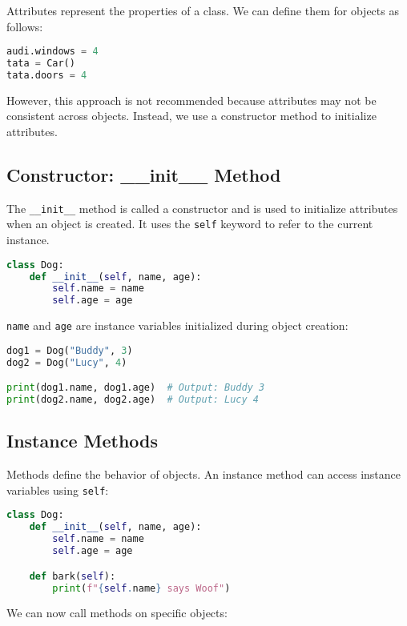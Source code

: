 Attributes represent the properties of a class. We can define them for objects as follows:

\begin{lstlisting}[language=Python]
audi.windows = 4
tata = Car()
tata.doors = 4
\end{lstlisting}

However, this approach is not recommended because attributes may not be consistent across objects. Instead, we use a constructor method to initialize attributes.

\subsection{Constructor: \_\_init\_\_ Method}

The \texttt{\_\_init\_\_} method is called a constructor and is used to initialize attributes when an object is created. It uses the \texttt{self} keyword to refer to the current instance.

\begin{lstlisting}[language=Python]
class Dog:
    def __init__(self, name, age):
        self.name = name
        self.age = age
\end{lstlisting}

\texttt{name} and \texttt{age} are instance variables initialized during object creation:

\begin{lstlisting}[language=Python]
dog1 = Dog("Buddy", 3)
dog2 = Dog("Lucy", 4)

print(dog1.name, dog1.age)  # Output: Buddy 3
print(dog2.name, dog2.age)  # Output: Lucy 4
\end{lstlisting}

\subsection{Instance Methods}

Methods define the behavior of objects. An instance method can access instance variables using \texttt{self}:

\begin{lstlisting}[language=Python]
class Dog:
    def __init__(self, name, age):
        self.name = name
        self.age = age

    def bark(self):
        print(f"{self.name} says Woof")
\end{lstlisting}

We can now call methods on specific objects:

